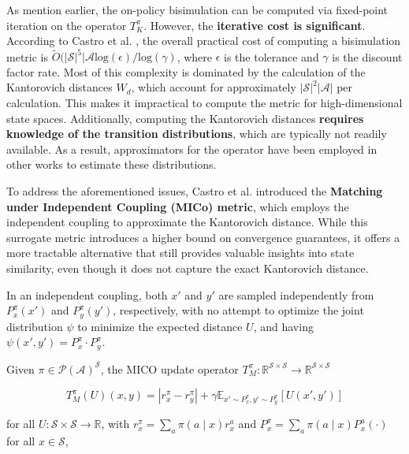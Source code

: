 As mention earlier, the on-policy bisimulation can be computed via fixed-point iteration on the operator $T_K^\pi$. However, the \textbf{iterative cost is significant}. According to Castro et al. \cite{castro2021mico}, the overall practical cost of computing a bisimulation metric is $\tilde{O}(|\mathcal{S}|^5 |\mathcal{A} \text{log}(\epsilon)/\text{log}(\gamma)$, where $\epsilon$ is the tolerance and $\gamma$ is the discount factor rate. Most of this complexity is dominated by the calculation of the Kantorovich distances $W_d$, which account for approximately $|\mathcal{S}|^2 |\mathcal{A}|$ per calculation. This makes it impractical to compute the metric for high-dimensional state spaces. Additionally, computing the Kantorovich distances \textbf{requires knowledge of the transition distributions}, which are typically not readily available. As a result, approximators for the operator have been employed in other works \cite{castro2020scalable, zhang2020learning} to estimate these distributions.

To address the aforementioned issues, Castro et al. \cite{castro2021mico} introduced the \textbf{Matching under Independent Coupling (MICo) metric}, which employs the independent coupling to approximate the Kantorovich distance. While this surrogate metric introduces a higher bound on convergence guarantees, it offers a more tractable alternative that still provides valuable insights into state similarity, even though it does not capture the exact Kantorovich distance.

In an independent coupling, both $x'$ and $y'$ are sampled independently from $P_x^\pi(x')$ and $P_y^\pi(y')$, respectively, with no attempt to optimize the joint distribution $\psi$ to minimize the expected distance $U$, and having $\psi(x',y') = P_x^\pi \cdot P_y^\pi$.

\begin{definition} 
\label{def:mico_operator}
Given $\pi \in \mathcal{P(A)}^{\mathcal{S}}$, the MICO update operator $T^\pi_M : \mathbb{R}^{\mathcal{S} \times \mathcal{S}} \rightarrow \mathbb{R}^{\mathcal{S} \times \mathcal{S}}$

\begin{equation}
\label{eq:mico_operator}
    T^\pi_M(U)(x, y) = |r^\pi_{x} - r^\pi_{y}| + \gamma \mathbb{E}_{x'\sim P_x^\pi, y'\sim P_y^\pi}\left[U(x',y') \right]
\end{equation}

for all $U: \mathcal{S} \times \mathcal{S} \rightarrow \mathbb{R}$, with $r_x^\pi =\sum_a \pi(a \mid x) r_x^a$ and $P_x^\pi =\sum_a \pi(a \mid x) P^a_x(\cdot) $ for all $x \in \mathcal{S}$, 
\end{definition}

